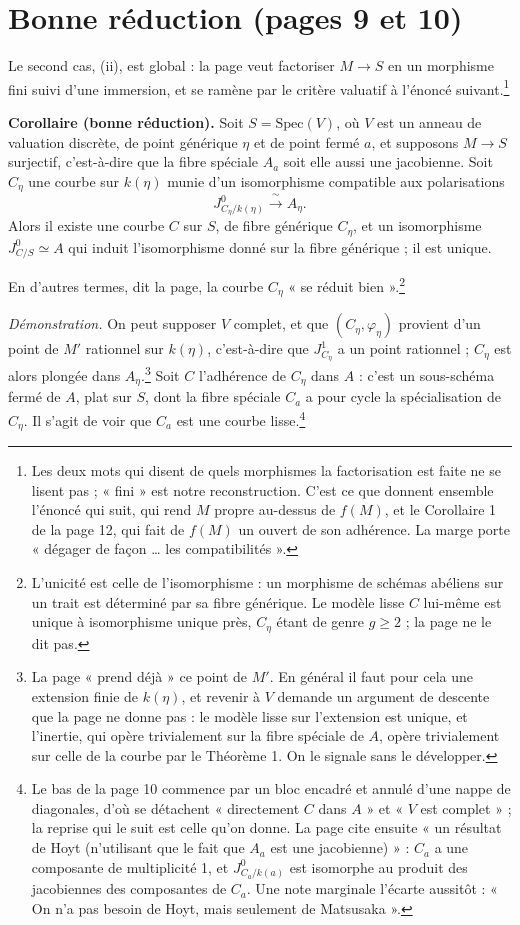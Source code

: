 \documentclass[11pt,a4paper]{article}
\begin{document}
\section*{Bonne réduction (pages 9 et 10)}

Le second cas, (ii), est global : la page veut factoriser $M \to S$ en un
morphisme fini suivi d'une immersion, et se ramène par le critère valuatif à
l'énoncé suivant.\footnote{Les deux mots qui disent de quels morphismes la
factorisation est faite ne se lisent pas ; « fini » est notre reconstruction.
C'est ce que donnent ensemble l'énoncé qui suit, qui rend $M$ propre au-dessus
de $f(M)$, et le Corollaire 1 de la page 12, qui fait de $f(M)$ un ouvert de
son adhérence. La marge porte « dégager de façon … les compatibilités ».}

\textbf{Corollaire (bonne réduction).} Soit $S = \mathrm{Spec}(V)$, où $V$ est
un anneau de valuation discrète, de point générique $\eta$ et de point fermé
$a$, et supposons $M \to S$ surjectif, c'est-à-dire que la fibre spéciale
$A_{a}$ soit elle aussi une jacobienne. Soit $C_{\eta}$ une courbe sur
$k(\eta)$ munie d'un isomorphisme compatible aux polarisations
\[
  J^{0}_{C_{\eta}/k(\eta)} \xrightarrow{\;\sim\;} A_{\eta}.
\]
Alors il existe une courbe $C$ sur $S$, de fibre générique $C_{\eta}$, et un
isomorphisme $J^{0}_{C/S} \simeq A$ qui induit l'isomorphisme donné sur la
fibre générique ; il est unique.

En d'autres termes, dit la page, la courbe $C_{\eta}$ « se réduit
bien ».\footnote{L'unicité est celle de l'isomorphisme : un morphisme de
schémas abéliens sur un trait est déterminé par sa fibre générique. Le modèle
lisse $C$ lui-même est unique à isomorphisme unique près, $C_{\eta}$ étant de
genre $g \geq 2$ ; la page ne le dit pas.}

\emph{Démonstration.} On peut supposer $V$ complet, et que $(C_{\eta},
\varphi_{\eta})$ provient d'un point de $M'$ rationnel sur $k(\eta)$,
c'est-à-dire que $J^{1}_{C_{\eta}}$ a un point rationnel ; $C_{\eta}$ est alors
plongée dans $A_{\eta}$.\footnote{La page « prend déjà » ce point de $M'$. En
général il faut pour cela une extension finie de $k(\eta)$, et revenir à $V$
demande un argument de descente que la page ne donne pas : le modèle lisse sur
l'extension est unique, et l'inertie, qui opère trivialement sur la fibre
spéciale de $A$, opère trivialement sur celle de la courbe par le Théorème 1.
On le signale sans le développer.} Soit $C$ l'adhérence de $C_{\eta}$ dans
$A$ : c'est un sous-schéma fermé de $A$, plat sur $S$, dont la fibre spéciale
$C_{a}$ a pour cycle la spécialisation de $C_{\eta}$. Il s'agit de voir que
$C_{a}$ est une courbe lisse.\footnote{Le bas de la page 10 commence par un
bloc encadré et annulé d'une nappe de diagonales, d'où se détachent
« directement $C$ dans $A$ » et « $V$ est complet » ; la reprise qui le suit est
celle qu'on donne. La page cite ensuite « un résultat de Hoyt (n'utilisant que
le fait que $A_{a}$ est une jacobienne) » : $C_{a}$ a une composante de
multiplicité 1, et $J^{0}_{C_{a}/k(a)}$ est isomorphe au produit des
jacobiennes des composantes de $C_{a}$. Une note marginale l'écarte aussitôt :
« On n'a pas besoin de Hoyt, mais seulement de Matsusaka ».}
\end{document}
